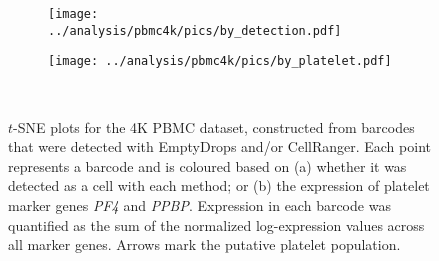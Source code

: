 \documentclass{article}
\begin{document}
\begin{figure}[btp]
    \begin{subfigure}{0.49\textwidth}
        \texttt{[image: ../analysis/pbmc4k/pics/by\_detection.pdf]}
        \caption{}
    \end{subfigure}
    \begin{subfigure}{0.49\textwidth}
        \texttt{[image: ../analysis/pbmc4k/pics/by\_platelet.pdf]}
        \caption{}
    \end{subfigure} \\[0.05in]
    \caption{$t$-SNE plots for the 4K PBMC dataset, constructed from barcodes that were detected with EmptyDrops and/or CellRanger.
        Each point represents a barcode and is coloured based on (a) whether it was detected as a cell with each method; 
		or (b) the expression of platelet marker genes \textit{PF4} and \textit{PPBP}.
        Expression in each barcode was quantified as the sum of the normalized log-expression values across all marker genes.
        Arrows mark the putative platelet population.
    }
    \label{fig:realpbmc}
\end{figure}
\end{document}
